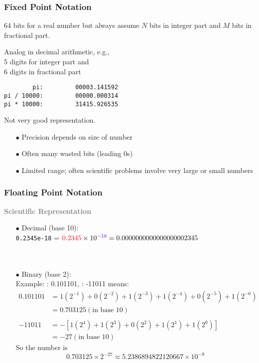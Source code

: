 \begin{frame}[fragile]

\frametitle{Fixed Point  Notation}
$64$ bits for a real number but always assume $N$ bits in integer part and $M$ bits in fractional part.

\medskip
Analog in decimal arithmetic, e.g.,\\
5 digits for integer part and\\
6 digits in fractional part

\begin{verbatim}
        pi:         00003.141592
pi / 10000:	        00000.000314
pi * 10000:         31415.926535
\end{verbatim}

Not very good representation. 
\begin{itemize}
\item[$\bullet$]  Precision depends on size of number
\item[$\bullet$]   Often many wasted bits (leading 0s)
\item[$\bullet$]   Limited range; often scientific problems involve very large or small numbers
\end{itemize}


\end{frame}




\begin{frame}[fragile]

\frametitle{Floating Point  Notation}
\textcolor{gray}{\bf\large Scientific Representation}\\

\begin{itemize}
\item[$\bullet$] Decimal (base 10):\\
\texttt{0.2345e-18} = $\textcolor{red}{0.2345} \times 10^{\textcolor{blue}{-18}} = 0.0000000000000000002345$\\
\medskip
{}\\
\\
\item[$\bullet$] Binary (base 2):\\
Example: : 0.101101, : -11011 means:
\begin{align*}
0.101101 &= 1(2^{-1}) + 0(2^{-2}) + 1(2^{-3}) + 1(2^{-4}) + 0(2^{-5}) + 1(2^{-6}) \\
	        &= 0.703125 (\text{in base 10})\\
	        \\
-11011 &= -[1(2^{4}) + 1(2^{3}) + 0(2^{2}) + 1(2^{1}) + 1(2^{0})  ]\\
	        &=-27 (\text{in base 10})
\end{align*}
So the number  is
$$
 0.703125 \times 2^{-27} \approx 5.2386894822120667 \times 10^{-9}
$$
\end{itemize}


\end{frame}

